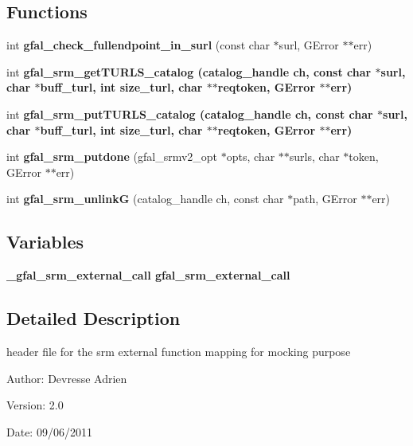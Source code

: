 \subsection*{Functions}
\begin{CompactItemize}
\item 
int \textbf{gfal\_\-check\_\-fullendpoint\_\-in\_\-surl} (const char $\ast$surl, GError $\ast$$\ast$err)\label{gfal__common__srm__internal__layer_8h_d12926fb068b66769f28f2c4fc177bd2}

\item 
int \bf{gfal\_\-srm\_\-get\-TURLS\_\-catalog} (catalog\_\-handle ch, const char $\ast$surl, char $\ast$buff\_\-turl, int size\_\-turl, char $\ast$$\ast$reqtoken, GError $\ast$$\ast$err)
\item 
int \bf{gfal\_\-srm\_\-put\-TURLS\_\-catalog} (catalog\_\-handle ch, const char $\ast$surl, char $\ast$buff\_\-turl, int size\_\-turl, char $\ast$$\ast$reqtoken, GError $\ast$$\ast$err)
\item 
int \textbf{gfal\_\-srm\_\-putdone} (gfal\_\-srmv2\_\-opt $\ast$opts, char $\ast$$\ast$surls, char $\ast$token, GError $\ast$$\ast$err)\label{gfal__common__srm__internal__layer_8h_0b73cfc8697e7ab0d68dc121047f405f}

\item 
int \textbf{gfal\_\-srm\_\-unlink\-G} (catalog\_\-handle ch, const char $\ast$path, GError $\ast$$\ast$err)\label{gfal__common__srm__internal__layer_8h_5f52f23ed20fcf63fe66e158a9748971}

\end{CompactItemize}
\subsection*{Variables}
\begin{CompactItemize}
\item 
\bf{\_\-gfal\_\-srm\_\-external\_\-call} \textbf{gfal\_\-srm\_\-external\_\-call}\label{gfal__common__srm__internal__layer_8h_67b12c7342043451fc5ce31b1a3d74fb}

\end{CompactItemize}


\subsection{Detailed Description}
header file for the srm external function mapping for mocking purpose 

\begin{Desc}
\item[Author:]Devresse Adrien \end{Desc}
\begin{Desc}
\item[Version:]2.0 \end{Desc}
\begin{Desc}
\item[Date:]09/06/2011 \end{Desc}


